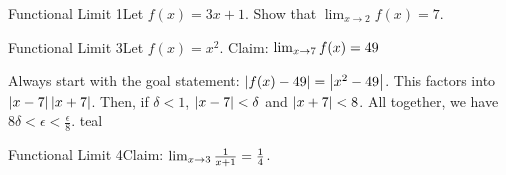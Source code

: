\begin{example}
    {Functional Limit 1}Let \(f(x) = 3x + 1\). Show that \(\lim_{x \rightarrow 2}f(x) = 7\).
\end{example}




\begin{example}
    {Functional Limit 3}Let \(f(x) = x^{2}\). Claim: \(\lim_{x \rightarrow 7}f(x) = 49\)
\end{example}

%
{
    Always start with the goal statement: \(\left|f(x) - 49\right| = \left|x^{2} - 49\right|\). This factors into \(\left|x - 7\right| \left|x + 7\right|\). Then, if \(\delta < 1\), \(\left|x - 7\right| < \delta\) and \(\left|x + 7\right| < 8\). All together, we have \(8\delta < \epsilon < \frac{\epsilon}{8}\).
}%
{teal}

\begin{example}
    {Functional Limit 4}Claim: \(\lim_{x \rightarrow 3}\frac{1}{x + 1} = \frac{1}{4}\).
\end{example}

